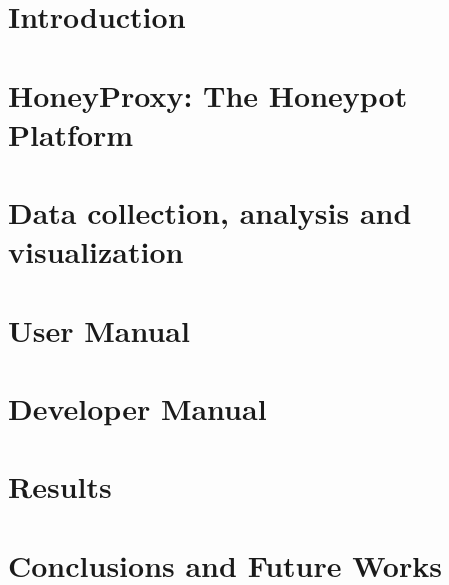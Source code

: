 \documentclass[pdfa%
,cucitura%
]{toptesi}
\begin{document}
\indici

\mainmatter

\chapter{Introduction}



\chapter{HoneyProxy: The Honeypot Platform}



\chapter{Data collection, analysis and visualization}



\chapter{User Manual}



\chapter{Developer Manual}



\chapter{Results}



\chapter{Conclusions and Future Works}




\end{document}

